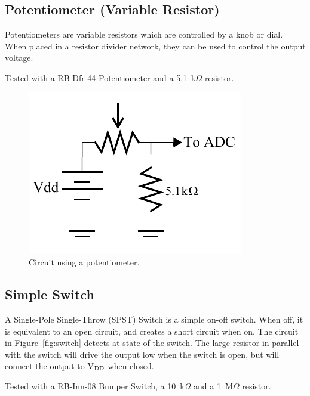 \documentclass[11pt, twoside, pdftex]{article}
\begin{document}
\subsection{Potentiometer (Variable Resistor)}
Potentiometers are variable resistors which are controlled by a knob or dial. When placed in a resistor divider network, they can be used to control the output voltage.

Tested with a {\sf RB-Dfr-44} Potentiometer and a 5.1~k$\Omega$ resistor.

\begin{figure} [H]
\begin{center}
\includegraphics{figures/potentiometer.pdf}
\end{center}
\caption{Circuit using a potentiometer.}
\label{fig:potentio}
\end{figure}

\pagebreak

\subsection{Simple Switch }
A Single-Pole Single-Throw (SPST) Switch is a simple on-off switch. When off, it is equivalent to an open circuit, and creates a short circuit when on.
The circuit in Figure~\ref{fig:switch} detects at state of the switch. The large resistor in parallel with the switch will drive the output low when the switch is open, but will connect the output to V$_{\rm DD}$ when closed.

Tested with a {\sf RB-Inn-08} Bumper Switch, a 10~k$\Omega$ and a 1~M$\Omega$ resistor.
\end{document}
